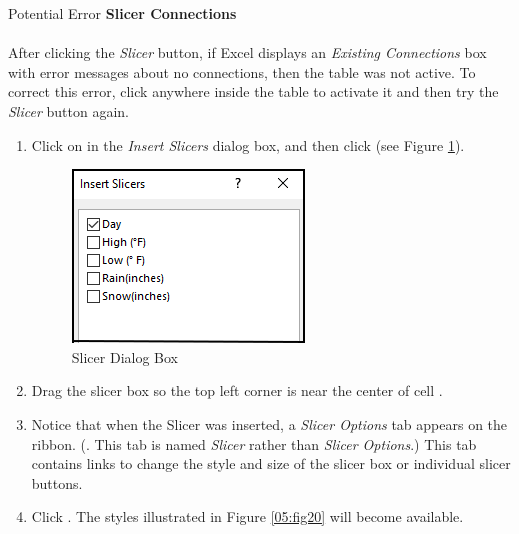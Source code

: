 \begin{center}
	\begin{infobox}{Potential Error}
		\textbf{Slicer Connections}
		\\
		\\
		After clicking the \textit{Slicer} button, if Excel displays an \textit{Existing Connections} box with error messages about no connections, then the table was not active. To correct this error, click anywhere inside the table to activate it and then try the \textit{Slicer} button again.
	\end{infobox}
\end{center}
				
\begin{enumbox}
	\begin{enumerate}
		\item Click on  in the \textit{Insert Slicers} dialog box, and then click  (see Figure \ref{05:fig20a}).
	
		\begin{figure}[H]
			\centering
			\includegraphics[width=\maxwidth{.50\linewidth}]{gfx/ch05_fig20a}
			\caption{Slicer Dialog Box}
			\label{05:fig20a}
		\end{figure}
		
		\item Drag the slicer box so the top left corner is near the center of cell .
		\item Notice that when the Slicer was inserted, a \textit{Slicer Options} tab appears on the ribbon. (. This tab is named \textit{Slicer} rather than \textit{Slicer Options}.) This tab contains links to change the style and size of the slicer box or individual slicer buttons.
		\item Click . The styles illustrated in Figure \ref{05:fig20} will become available.
	\end{enumerate}
\end{enumbox}
	
